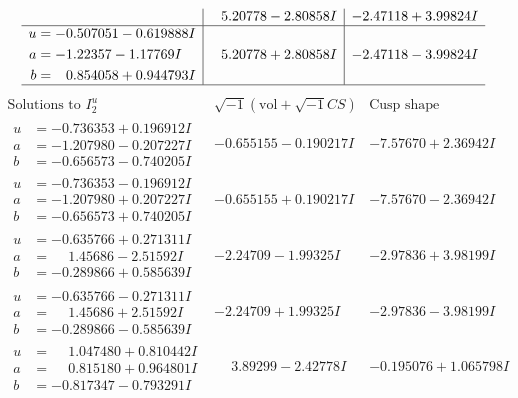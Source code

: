 \documentclass[1p]{elsarticle_modified}
\theoremstyle{definition}
\newcommand{\I}{\sqrt{-1}}
\begin{document}
$$\begin{array}{c|c|c}
 & \phantom{-}5.20778 - 2.80858 I & -2.47118 + 3.99824 I \\ \hline\begin{aligned}
u &= -0.507051 - 0.619888 I \\
a &= -1.22357 - 1.17769 I \\
b &= \phantom{-}0.854058 + 0.944793 I\end{aligned}
 & \phantom{-}5.20778 + 2.80858 I & -2.47118 - 3.99824 I\\
 \hline 
 \end{array}$$\newpage$$\begin{array}{c|c|c}  
\text{Solutions to }I^u_{2}& \I (\text{vol} + \sqrt{-1}CS) & \text{Cusp shape}\\
 \hline 
\begin{aligned}
u &= -0.736353 + 0.196912 I \\
a &= -1.207980 - 0.207227 I \\
b &= -0.656573 - 0.740205 I\end{aligned}
 & -0.655155 - 0.190217 I & -7.57670 + 2.36942 I \\ \hline\begin{aligned}
u &= -0.736353 - 0.196912 I \\
a &= -1.207980 + 0.207227 I \\
b &= -0.656573 + 0.740205 I\end{aligned}
 & -0.655155 + 0.190217 I & -7.57670 - 2.36942 I \\ \hline\begin{aligned}
u &= -0.635766 + 0.271311 I \\
a &= \phantom{-}1.45686 - 2.51592 I \\
b &= -0.289866 + 0.585639 I\end{aligned}
 & -2.24709 - 1.99325 I & -2.97836 + 3.98199 I \\ \hline\begin{aligned}
u &= -0.635766 - 0.271311 I \\
a &= \phantom{-}1.45686 + 2.51592 I \\
b &= -0.289866 - 0.585639 I\end{aligned}
 & -2.24709 + 1.99325 I & -2.97836 - 3.98199 I \\ \hline\begin{aligned}
u &= \phantom{-}1.047480 + 0.810442 I \\
a &= \phantom{-}0.815180 + 0.964801 I \\
b &= -0.817347 - 0.793291 I\end{aligned}
 & \phantom{-}3.89299 - 2.42778 I & -0.195076 + 1.065798 I \\ \hline\begin{aligned}

\end{aligned}
\end{array}$$
\end{document}
